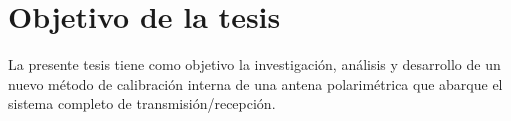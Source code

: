
\chapter{Objetivo de la tesis}
\label{ch:objetivo}
La presente tesis tiene como objetivo la investigación, análisis y 
desarrollo de un nuevo método de calibración interna de una antena 
polarimétrica que abarque el sistema completo de transmisión/recepción. 

\begin{comment}
En este capítulo se desarrolla con mayor profundidad los atributos de los sistemas de celdas de combustible y se presentan los modelos que
se utilizaron en el emulador diseñado. A grandes rasgos la tensión decrece a medida que la corriente demandada aumenta y los efectos que
lo producen son diversos y se explican a continuación.

\section{Características eléctricas}
\label{sec:cacteristicas}
En la fig. \ref{fig:caracteristica_electrica} se han diferenciado tres regiones en las que la curva se comporta siguiendo una tendencia particular
Hay una súbita caída de tensión a bajas corrientes y luego una región aproximadamente lineal, para luego volver a precipitarse nuevamente a altas corrientes.
En la bibliografía se explican éstas tendencias causadas por efectos independientes y por ello en los modelos se identifican tres términos distintos,
según su naturaleza.

Es importante aclarar que de ahora en más se hará referencia a la densidad de corriente en lugar de simplemente la corriente,
debido a que la corriente total depende de la velocidad de reacción y esto depende en gran medida del \emph{área efectiva}
de la celda. Así la densidad de corriente se denota por $i$ y se mide en $[Acm^{-2}]$

\subsection{Tensión reversible de circuito abierto}
La tensión de circuito abierto representa el límite superior de en la tensión que una celda puede entregar, aunque tampoco suele ser la tensión que
realmente entrega si la carga es nula y ello se explicará más adelante.


\end{comment}
